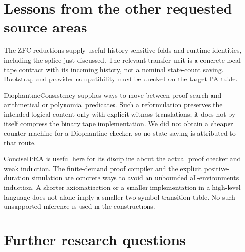 \documentclass[11pt,letterpaper]{article}
\begin{document}
\section{Lessons from the other requested source areas}

The ZFC reductions supply useful history-sensitive folds and runtime
identities, including the splice just discussed. The relevant transfer
unit is a concrete local tape contract with its incoming history, not a
nominal state-count saving. Bootstrap and provider compatibility must be
checked on the target PA table.

DiophantineConsistency supplies ways to move between proof search and
arithmetical or polynomial predicates. Such a reformulation preserves
the intended logical content only with explicit witness translations;
it does not by itself compress the binary tape implementation. We did
not obtain a cheaper counter machine for a Diophantine checker, so no
state saving is attributed to that route.

ConciseIPRA is useful here for its discipline about the actual proof
checker and weak induction. The finite-demand proof compiler and the
explicit positive-duration simulation are concrete ways to avoid an
unbounded all-environments induction. A shorter axiomatization or a
smaller implementation in a high-level language does not alone imply a
smaller two-symbol transition table. No such unsupported inference is
used in the constructions.

\section{Further research questions}
\end{document}
